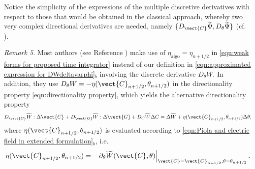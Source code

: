 {{Notice the simplicity of the expressions of the multiple discretive derivatives with respect to those that would be obtained in the classical approach, whereby two very complex directional derivatives are needed, namely $\{D_{\vect{C}}\widetilde{\Psi},D_{\theta}\widetilde{\Psi}\}$ (cf. \cite{Betsch2018Thermo,Conde2017}).


\noindent\makebox[\linewidth]{\rule{\textwidth}{0.4pt}}

\noindent \textit{Remark 5.} Most authors (see Reference \cite{Hesch_Betsch_EM_thermo_2011}) make use of  $\eta_{\text{algo}}=\eta_{n+1/2}$ in \eqref{eqn:weak forms for proposed time integrator} instead of our definition in \eqref{eqn:approximated expression for DWdeltavarphi}$_b$ involving the discrete derivative $D_{\theta}W$. In addition, they use $D_{\theta}W=-\eta(\vect{C}_{n+1/2},\theta_{n+1/2})$ in the directionality property \eqref{eqn:directionality property}, which yields the alternative directionality property
%
\begin{equation}\label{eqn:directionality alternative}
D_{\vect{C}}\widetilde{W}:\Delta\vect{C} + 
D_{\vect{G}}\widetilde{W}:\Delta\vect{G} + 
D_{C}\widetilde{W}\Delta C  =\Delta \widetilde{W} + \eta(\vect{C}_{n+1/2},\theta_{n+1/2})\Delta \theta,
\end{equation}
%
where $\eta(\vect{C}_{n+1/2},\theta_{n+1/2})$ is evaluated according to \eqref{eqn:Piola and electric field in extended formulation}$_b$, i.e.
%
\begin{equation}
\eta(\vect{C}_{n+1/2},\theta_{n+1/2})=\left.-\partial_{\theta}\widetilde{W}(\vect{C},\theta)\right\vert_{\vect{C}=\vect{C}_{n+1/2},\theta=\theta_{n+1/2}}.
\end{equation}
%

}}
